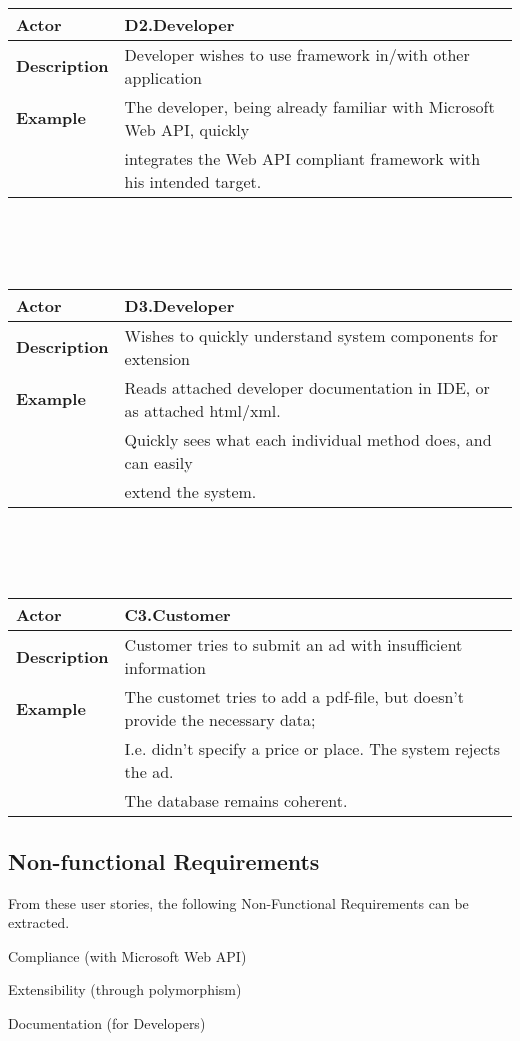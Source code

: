 \\\\\\
\begin{tabular}{| l | l |}
	\hline
	\textbf{Actor} & D2.Developer \\
	\hline
	\textbf{Description} & Developer wishes to use framework in/with other application \\
	\hline
	\textbf{Example} & The developer, being already familiar with Microsoft Web API, quickly \\
	& integrates the Web API compliant framework with his intended target.\\
	\hline
	
\end{tabular}
\\\\\\
\begin{tabular}{| l | l |}
	\hline
	\textbf{Actor} & D3.Developer \\
	\hline
	\textbf{Description} & Wishes to quickly understand system components for extension \\
	\hline
	\textbf{Example} & Reads attached developer documentation in IDE, or as attached html/xml.\\
	& Quickly sees what each individual method does, and can easily \\
	& extend the system.\\
	\hline
	
\end{tabular}
\\\\\\
\begin{tabular}{| l | l |}
	\hline
	\textbf{Actor} & C3.Customer \\
	\hline
	\textbf{Description} & Customer tries to submit an ad with insufficient information \\
	\hline
	\textbf{Example} & The customet tries to add a pdf-file, but doesn't provide the necessary data;\\
	& I.e. didn't specify a price or place. The system rejects the ad.\\
	& The database remains coherent.\\
	\hline
	
\end{tabular}

\subsection{Non-functional Requirements}

From these user stories, the following Non-Functional Requirements can be extracted. 

\itemize
\item Compliance (with Microsoft Web API)
\item Extensibility (through polymorphism)
\item Documentation (for Developers)